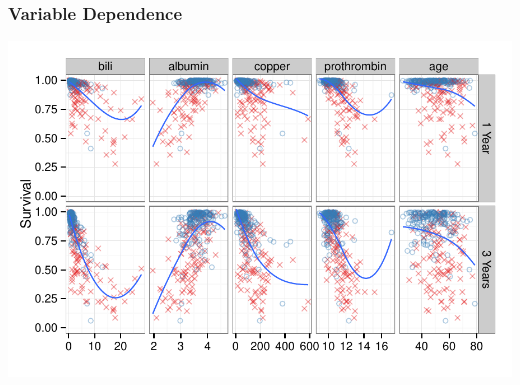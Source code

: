 \documentclass[xcolor=svgnames]{beamer}\usepackage[]{graphicx}\usepackage[]{color}
\newenvironment{knitrout}{}{} %
\begin{document}
\begin{frame}
\frametitle{Variable Dependence}

\begin{knitrout}\footnotesize
{}\color{fgcolor}

{\centering \includegraphics[width=.9\linewidth]{figures/variable-plot-pbc-1} 

}



\end{knitrout}
\end{frame}
%
%
\end{document}
